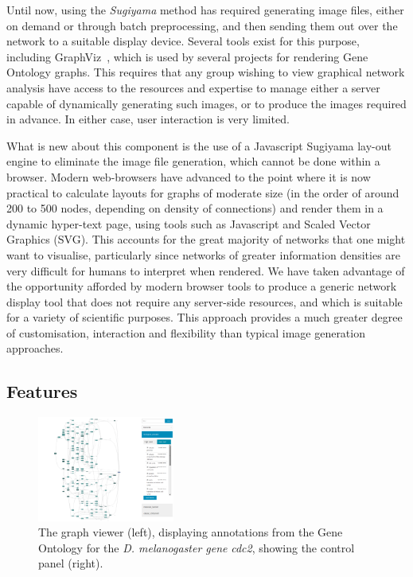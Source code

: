 \documentclass[10pt,a4paper,twocolumn]{article}
\begin{document}
Until now, using the \emph{Sugiyama} method has required generating image files,
either on demand or through batch preprocessing, and then sending them out over the network to
a suitable display device. Several tools exist for this purpose, including
GraphViz~\cite{graphviz}, which is used by several projects for rendering Gene Ontology
graphs. This requires that any group wishing to view graphical
network analysis have access to the resources and expertise to manage either
a server capable of dynamically generating such images, or to produce the
images required in advance. In either case, user interaction is very limited.

What is new about this component is the use of a Javascript Sugiyama lay-out engine
to eliminate the image file generation, which cannot be done within a browser.
Modern web-browsers have advanced to the point where it is now practical to
calculate layouts for graphs of moderate size (in the order of around 200 to 500
nodes, depending on density of connections) and render them in a dynamic hyper-text
page, using tools such as Javascript and Scaled Vector Graphics (SVG). This accounts
for the great majority of networks that one might want to visualise, particularly
since networks of greater information densities are very difficult for humans to
interpret when rendered. We have taken advantage of the opportunity afforded
by modern browser tools to produce a generic network display tool that does not require
any server-side resources, and which is suitable for a
variety of scientific purposes. This approach provides a much greater degree of customisation,
interaction and flexibility than typical image generation approaches.

\subsection*{Features}

\begin{figure}[htb]
\centering
\includegraphics[width=0.4\textwidth]{dagify.png}
\caption{
    \label{fig:1}
    The graph viewer (left), displaying annotations from the Gene Ontology for
    the \textit{D. melanogaster gene} \emph{cdc2}, showing the control panel (right).
}
\end{figure}
\end{document}

